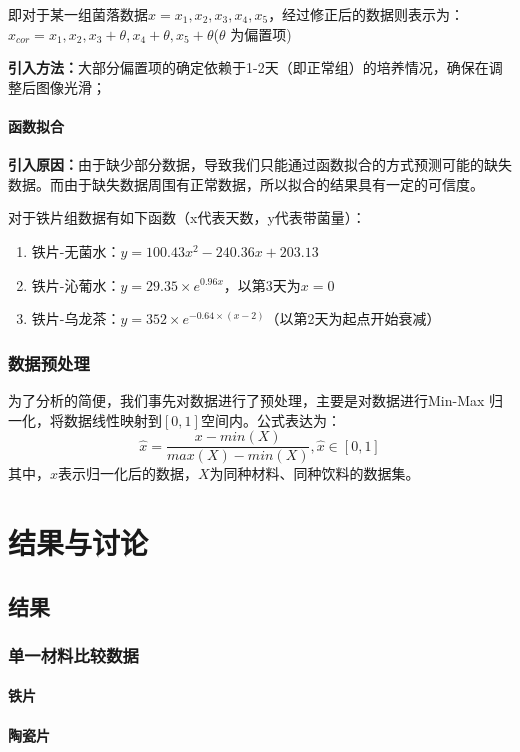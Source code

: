 \documentclass[12pt,a4paper]{ctexart}
\begin{document}
即对于某一组菌落数据${x}={x_1,x_2,x_3,x_4,x_5}$，经过修正后的数据则表示为：$x_{cor}=x_1,x_2,x_3+\theta,x_4+\theta,x_5+\theta $($\theta$ 为偏置项)

\textbf{引入方法：}大部分偏置项的确定依赖于1-2天（即正常组）的培养情况，确保在调整后图像光滑；

\paragraph{函数拟合}
\textbf{引入原因：}由于缺少部分数据，导致我们只能通过函数拟合的方式预测可能的缺失数据。而由于缺失数据周围有正常数据，所以拟合的结果具有一定的可信度。

对于铁片组数据有如下函数（x代表天数，y代表带菌量）：
\begin{enumerate}
    \item 铁片-无菌水：$ y = 100.43x^2 - 240.36x + 203.13$
    \item 铁片-沁葡水：$y = 29.35 \times e^{0.96x}$，以第3天为$x=0$
    \item 铁片-乌龙茶：$y = 352 \times e^{-0.64 \times (x-2)} $（以第2天为起点开始衰减）
\end{enumerate}

\subsubsection{数据预处理}
为了分析的简便，我们事先对数据进行了预处理，主要是对数据进行Min-Max 归一化，将数据线性映射到$[0,1]$空间内。公式表达为：
\begin{equation}
    \hat{x}=\frac{x−min(X)​}{max(X)−min(X)},\hat{x} \in [0,1]
\end{equation}
其中，$\hat{x}$表示归一化后的数据，$X$为同种材料、同种饮料的数据集。
\section{结果与讨论}
\subsection{结果}
\subsubsection{单一材料比较数据}
\paragraph{铁片}

\paragraph{陶瓷片}
\end{document}
